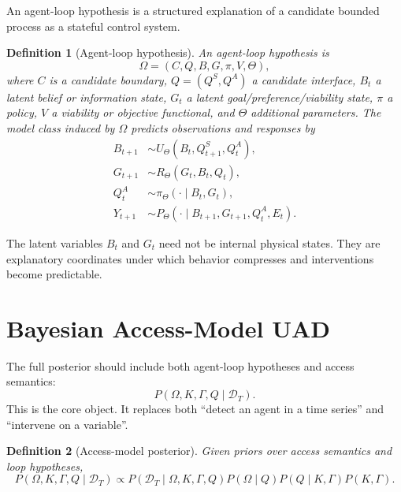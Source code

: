 \documentclass[11pt]{article}
\newtheorem{definition}{Definition}
\newcommand{\D}{\mathcal D}
\begin{document}
An agent-loop hypothesis is a structured explanation of a candidate bounded
process as a stateful control system.

\begin{definition}[Agent-loop hypothesis]
An agent-loop hypothesis is
\[
    \Omega
    =
    (C,Q,B,G,\pi,V,\Theta),
\]
where $C$ is a candidate boundary, $Q=(Q^S,Q^A)$ a candidate interface, $B_t$ a
latent belief or information state, $G_t$ a latent goal/preference/viability
state, $\pi$ a policy, $V$ a viability or objective functional, and $\Theta$
additional parameters. The model class induced by $\Omega$ predicts observations
and responses by
\begin{align}
    B_{t+1}
    &\sim
    U_\Theta(B_t,Q^S_{t+1},Q^A_t),
    \\
    G_{t+1}
    &\sim
    R_\Theta(G_t,B_t,Q_t),
    \\
    Q^A_t
    &\sim
    \pi_\Theta(\cdot\mid B_t,G_t),
    \\
    Y_{t+1}
    &\sim
    P_\Theta(\cdot\mid B_{t+1},G_{t+1},Q^A_t,E_t).
\end{align}
\end{definition}

The latent variables $B_t$ and $G_t$ need not be internal physical states. They
are explanatory coordinates under which behavior compresses and interventions
become predictable.

\section{Bayesian Access-Model UAD}

The full posterior should include both agent-loop hypotheses and access semantics:
\[
    P(\Omega,K,\Gamma,Q\mid \D_T).
\]
This is the core object. It replaces both ``detect an agent in a time series''
and ``intervene on a variable''.

\begin{definition}[Access-model posterior]
Given priors over access semantics and loop hypotheses,
\begin{equation}
    P(\Omega,K,\Gamma,Q\mid \D_T)
    \propto
    P(\D_T\mid \Omega,K,\Gamma,Q)
    P(\Omega\mid Q)
    P(Q\mid K,\Gamma)
    P(K,\Gamma).
    \label{eq:posterior}
\end{equation}
\end{definition}
\end{document}
